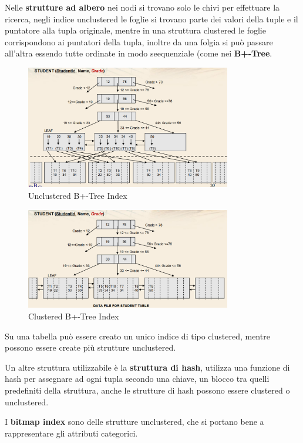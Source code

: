 \documentclass[12pt]{article}
\begin{document}
Nelle \textbf{strutture ad albero} nei nodi si trovano solo le chivi per effettuare la ricerca, negli indice unclustered le foglie si trovano parte dei valori della tuple e il puntatore alla tupla originale, mentre in una struttura clustered le foglie corrispondono ai puntatori della tupla, inoltre da una folgia si pu\`o passare all'altra essendo tutte ordinate in modo seequenziale (come nei \textbf{B+-Tree}.
\begin{figure}[H]
    \centering
    \includegraphics[width=0.8\textwidth]{unclustered-b-tree.png}
    \caption{Unclustered B+-Tree Index}
    \label{fig:unclustered-b-tree}
\end{figure}
\begin{figure}[H]
    \centering
    \includegraphics[width=0.8\textwidth]{clustered-b-tree.png}
    \caption{Clustered B+-Tree Index}
    \label{fig:clustered-b-tree}
\end{figure}
Su una tabella pu\`o essere creato un unico indice di tipo clustered, mentre possono essere create pi\`u strutture unclustered.


Un altre struttura utilizzabile \`e la \textbf{struttura di hash}, utilizza una funzione di hash per assegnare ad ogni tupla secondo una chiave, un blocco tra quelli predefiniti della struttura, anche le strutture di hash possono essere clustered o unclustered.


I \textbf{bitmap index} sono delle strutture unclustered, che si portano bene a rappresentare gli attributi categorici.
\end{document}
